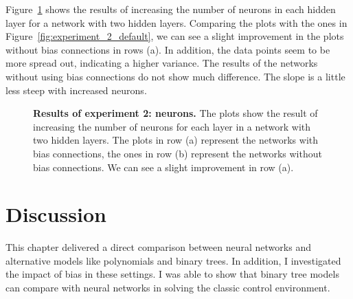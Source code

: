 Figure~\ref{fig:experiment_2_neurons} shows the results of increasing the number of neurons in each hidden layer for a network with two hidden layers. Comparing the plots with the ones in Figure~\ref{fig:experiment_2_default}, we can see a slight improvement in the plots without bias connections in rows (a). In addition, the data points seem to be more spread out, indicating a higher variance. The results of the networks without using bias connections do not show much difference. The slope is a little less steep with increased neurons.
\begin{figure}[!ht]
\begin{figrow}
\item \label{row:NN_with_bias_neurons} 
\item \label{row:NN_without_neurons}  
\end{figrow}
\caption[Results of experiment 2: neurons]{
  \textbf{Results of experiment 2: neurons.}
  The plots show the result of increasing the number of neurons for each layer in a network with two hidden layers. The plots in row (a) represent the networks with bias connections, the ones in row (b) represent the networks without bias connections. We can see a slight improvement in row (a).
}
\label{fig:experiment_2_neurons}
\end{figure}


\section{Discussion}
This chapter delivered a direct comparison between neural networks and alternative models like polynomials and binary trees. In addition, I investigated the impact of bias in these settings. I was able to show that binary tree models can compare with neural networks in solving the classic control environment.

